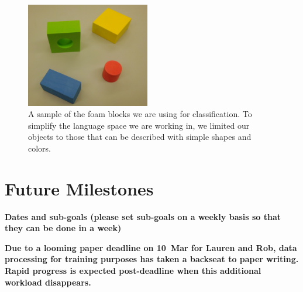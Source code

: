\documentclass[11pt]{article}
\newcommand{\xxx}[1]{{\bf \color{red} #1}}
\newcommand{\meh}[1]{{\bf \color{blue} #1}}
\begin{document}
\begin{figure}
\centering
\includegraphics[width=0.48\textwidth]{figures/blocks.png}
\caption{A sample of the foam blocks we are using for classification. To
    simplify the language space we are working in, we limited our objects to
    those that can be described with simple shapes and colors.}
\label{fig:blocks}
\end{figure}

\section{Future Milestones}
\xxx{Dates and sub-goals (please set sub-goals on a weekly basis so that they
    can be done in a week)}

\meh{Due to a looming paper deadline on 10~Mar for Lauren and Rob, data
    processing for training purposes has taken a backseat to paper writing.
    Rapid progress is expected post-deadline when this additional workload
    disappears.}
\end{document}
